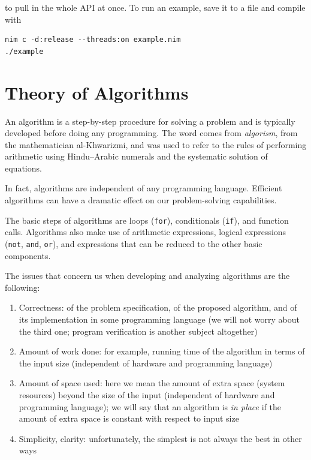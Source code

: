 \documentclass[justified, sixbynine]{tufte-book}
\def\ft{\small\tt}
\theoremstyle{plain}%
\newtheorem * {corollary}{Corollary}
\theoremstyle{definition}
\theoremstyle{remark}
\newtheorem * {remark}{Remark}
\newtheorem * {note}{Note}
\begin{document}
\begin{fullwidth}
to pull in the whole API at once. To run an example, save it to a file and compile with

\begin{lstlisting}
nim c -d:release --threads:on example.nim
./example
\end{lstlisting}

\chapter{Theory of Algorithms}

An algorithm is a step-by-step procedure for solving a problem and is typically developed before doing any programming.
The word comes from {\it algorism}, from the mathematician al-Khwarizmi, and was used to refer to the rules of performing arithmetic using Hindu--Arabic numerals and the systematic solution of equations.

In fact, algorithms are independent
of any programming language. Efficient algorithms can have a dramatic effect
on our problem-solving capabilities.

The basic steps of algorithms are loops ({\ft for}), conditionals ({\ft if}), and function calls.
Algorithms also make use of arithmetic expressions, logical expressions ({\ft not}, {\ft and}, {\ft or}), and expressions that can be reduced to the other basic components.

The issues that concern us when developing and analyzing algorithms are the following:

\begin{enumerate}
\item  Correctness: of the problem specification, of the proposed algorithm,
and of its implementation in some programming language (we will not worry
about the third one; program verification is another subject altogether)

\item  Amount of work done: for example, running time of the algorithm in terms of
the input size (independent of hardware and programming language)

\item  Amount of space used: here we mean the amount of extra space (system resources) beyond
the size of the input (independent of hardware and programming language);
we will say that an algorithm is {\em in place} if the amount of extra space
is constant with respect to input size

\item  Simplicity, clarity: unfortunately, the simplest is not always the
best in other ways


\end{enumerate}
\end{fullwidth}
\end{document}
